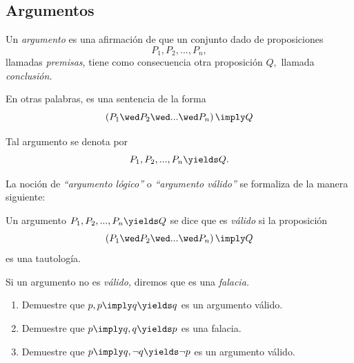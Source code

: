 \subsection{Argumentos}


 Un \emph{argumento} es una afirmación de que un conjunto dado de proposiciones $$P_{1}, P_{2},...,P_{n},$$ llamadas \emph{premisas}, tiene como consecuencia otra proposición $Q,$ llamada \emph{conclusión.}
 
 En otras palabras, es una sentencia de la forma
 $$
  \left( P_{1} \wed P_{2} \wed...\wed P_{n}\right) \imply Q
  $$
 
 
 
 Tal argumento se denota por $$P_{1}, P_{2},...,P_{n} \yields Q.$$



 La noción de \emph{``argumento lógico''} o \emph{``argumento válido''} se formaliza de la manera siguiente:
 
 
 \begin{definicion}
  \label{lip:4.4}
  Un argumento $P_{1}, P_{2},...,P_{n} \yields Q$ se dice que es \emph{válido} si la proposición 
  $$
  \left( P_{1} \wed P_{2} \wed...\wed P_{n}\right) \imply Q
  $$ es una tautología.
  
   Si un argumento no es \emph{válido,} diremos que es una \emph{falacia.}
 \end{definicion}




 \begin{ejemplo}
 \label{lip:exmp:4.4}
  \begin{enumerate}
   \item Demuestre que $p, p\imply q \yields q$ es un argumento válido. 
   \item Demuestre que $p\imply q, q \yields p$ es una falacia.
   
   \item Demuestre que $p\imply q, \neg q \yields \neg p$ es un argumento válido.
  \end{enumerate}

 \end{ejemplo}

